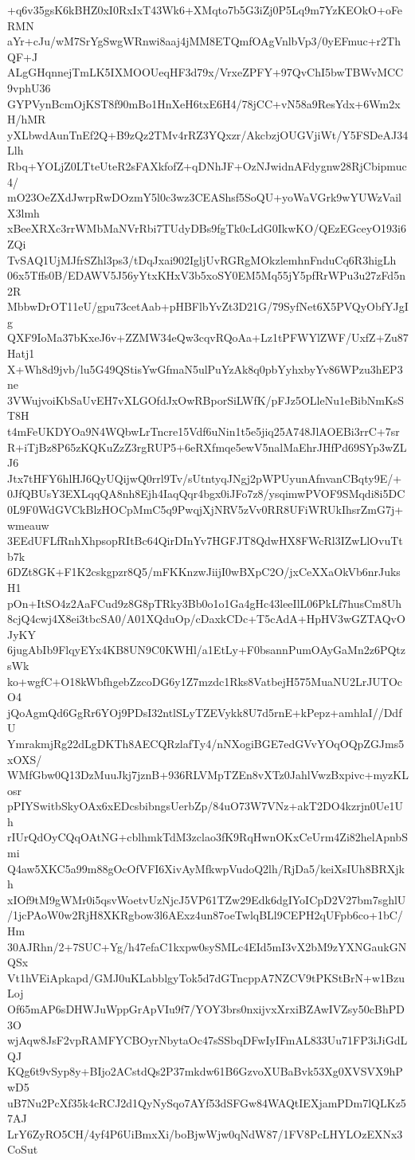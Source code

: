 +q6v35gsK6kBHZ0xI0RxIxT43Wk6+XMqto7b5G3iZj0P5Lq9m7YzKEOkO+oFeRMN
aYr+cJu/wM7SrYgSwgWRnwi8aaj4jMM8ETQmfOAgVnlbVp3/0yEFmuc+r2ThQF+J
ALgGHqnnejTmLK5IXMOOUeqHF3d79x/VrxeZPFY+97QvChI5bwTBWvMCC9vphU36
GYPVynBcmOjKST8f90mBo1HnXeH6txE6H4/78jCC+vN58a9ResYdx+6Wm2xH/hMR
yXLbwdAunTnEf2Q+B9zQz2TMv4rRZ3YQxzr/AkcbzjOUGVjiWt/Y5FSDeAJ34Llh
Rbq+YOLjZ0LTteUteR2sFAXkfofZ+qDNhJF+OzNJwidnAFdygnw28RjCbipmuc4/
mO23OeZXdJwrpRwDOzmY5l0c3wz3CEAShsf5SoQU+yoWaVGrk9wYUWzVailX3lmh
xBeeXRXc3rrWMbMaNVrRbi7TUdyDBs9fgTk0cLdG0IkwKO/QEzEGceyO193i6ZQi
TvSAQ1UjMJfrSZhl3ps3/tDqJxai902IgljUvRGRgMOkzlemhnFnduCq6R3higLh
06x5Tffs0B/EDAWV5J56yYtxKHxV3b5xoSY0EM5Mq55jY5pfRrWPu3u27zFd5n2R
MbbwDrOT11eU/gpu73cetAab+pHBFlbYvZt3D21G/79SyfNet6X5PVQyObfYJgIg
QXF9IoMa37bKxeJ6v+ZZMW34eQw3cqvRQoAa+Lz1tPFWYlZWF/UxfZ+Zu87Hatj1
X+Wh8d9jvb/lu5G49QStisYwGfmaN5ulPuYzAk8q0pbYyhxbyYv86WPzu3hEP3ne
3VWujvoiKbSaUvEH7vXLGOfdJxOwRBporSiLWfK/pFJz5OLleNu1eBibNmKsST8H
t4mFeUKDYOa9N4WQbwLrTncre15Vdf6uNin1t5e5jiq25A748JlAOEBi3rrC+7sr
R+iTjBz8P65zKQKuZzZ3rgRUP5+6eRXfmqe5ewV5nalMaEhrJHfPd69SYp3wZLJ6
Jtx7tHFY6hlHJ6QyUQijwQ0rrl9Tv/sUtntyqJNgj2pWPUyunAfnvanCBqty9E/+
0JfQBUsY3EXLqqQA8nh8Ejh4IaqQqr4bgx0iJFo7z8/ysqimwPVOF9SMqdi8i5DC
0L9F0WdGVCkBlzHOCpMmC5q9PwqjXjNRV5zVv0RR8UFiWRUkIhsrZmG7j+wmeauw
3EEdUFLfRnhXhpsopRItBc64QirDInYv7HGFJT8QdwHX8FWcRl3IZwLlOvuTtb7k
6DZt8GK+F1K2cskgpzr8Q5/mFKKnzwJiijI0wBXpC2O/jxCeXXaOkVb6nrJuksH1
pOn+ItSO4z2AaFCud9z8G8pTRky3Bb0o1o1Ga4gHc43leeIlL06PkLf7husCm8Uh
8cjQ4cwj4X8ei3tbcSA0/A01XQduOp/cDaxkCDc+T5cAdA+HpHV3wGZTAQvOJyKY
6jugAbIb9FlqyEYx4KB8UN9C0KWHl/a1EtLy+F0bsannPumOAyGaMn2z6PQtzsWk
ko+wgfC+O18kWbfhgebZzcoDG6y1Z7mzdc1Rks8VatbejH575MuaNU2LrJUTOcO4
jQoAgmQd6GgRr6YOj9PDsI32ntlSLyTZEVykk8U7d5rnE+kPepz+amhlaI//DdfU
YmrakmjRg22dLgDKTh8AECQRzlafTy4/nNXogiBGE7edGVvYOqOQpZGJms5xOXS/
WMfGbw0Q13DzMuuJkj7jznB+936RLVMpTZEn8vXTz0JahlVwzBxpivc+myzKLosr
pPIYSwitbSkyOAx6xEDcsbibngsUerbZp/84uO73W7VNz+akT2DO4kzrjn0Ue1Uh
rIUrQdOyCQqOAtNG+cblhmkTdM3zclao3fK9RqHwnOKxCeUrm4Zi82helApnbSmi
Q4aw5XKC5a99m88gOcOfVFI6XivAyMfkwpVudoQ2lh/RjDa5/keiXsIUh8BRXjkh
xIOf9tM9gWMr0i5qsvWoetvUzNjcJ5VP61TZw29Edk6dgIYoICpD2V27bm7sghlU
/1jcPAoW0w2RjH8XKRgbow3l6AExz4un87oeTwlqBLl9CEPH2qUFpb6co+1bC/Hm
30AJRhn/2+7SUC+Yg/h47efaC1kxpw0sySMLc4EId5mI3vX2bM9zYXNGaukGNQSx
Vt1hVEiApkapd/GMJ0uKLabblgyTok5d7dGTncppA7NZCV9tPKStBrN+w1BzuLoj
Of65mAP6sDHWJuWppGrApVIu9f7/YOY3brs0nxijvxXrxiBZAwIVZsy50cBhPD3O
wjAqw8JsF2vpRAMFYCBOyrNbytaOc47sSSbqDFwIyIFmAL833Uu71FP3iJiGdLQJ
KQg6t9vSyp8y+BIjo2ACstdQs2P37mkdw61B6GzvoXUBaBvk53Xg0XVSVX9hPwD5
uB7Nu2PcXf35k4cRCJ2d1QyNySqo7AYf53dSFGw84WAQtIEXjamPDm7lQLKz57AJ
LrY6ZyRO5CH/4yf4P6UiBmxXi/boBjwWjw0qNdW87/1FV8PcLHYLOzEXNx3CoSut
